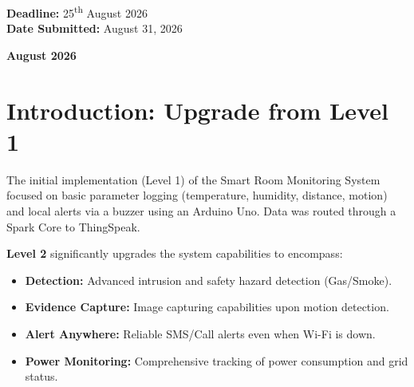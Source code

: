 \documentclass[12pt,a4paper]{article}
\begin{document}
\begin{titlepage}
    \vspace{-1.5cm}
    \begin{flushright}
        \textbf{Deadline:} 25\textsuperscript{th} August 2026 \\
        \textbf{Date Submitted:} August 31, 2026
    \end{flushright}
    
    \vspace{1cm}
    {\large \textbf{August 2026}}
\end{titlepage}

\newpage
\begin{abstract}
This report details the Level 2 upgrade of the Smart Room Monitoring System. Evolving from a basic local monitor, the system now incorporates advanced security, safety, and energy monitoring layers. Utilizing an ESP32-CAM as the core processor, it captures image evidence of intrusions and utilizes a SIM800L GSM module for redundant alerting during Wi-Fi outages. Furthermore, power sensors (ZMPT101B and ACS712) continuously log electrical consumption and grid stability. Data is visualized dynamically on ThingSpeak, with critical alerts dispatched via Telegram and SMS, rendering the system highly autonomous and suitable for real-world deployment in areas with unstable power or internet grids.
\end{abstract}

\tableofcontents
\newpage

\section{Introduction: Upgrade from Level 1}
The initial implementation (Level 1) of the Smart Room Monitoring System focused on basic parameter logging (temperature, humidity, distance, motion) and local alerts via a buzzer using an Arduino Uno. Data was routed through a Spark Core to ThingSpeak. 

\textbf{Level 2} significantly upgrades the system capabilities to encompass:
\begin{itemize}
    \item \textbf{Detection:} Advanced intrusion and safety hazard detection (Gas/Smoke).
    \item \textbf{Evidence Capture:} Image capturing capabilities upon motion detection.
    \item \textbf{Alert Anywhere:} Reliable SMS/Call alerts even when Wi-Fi is down.
    \item \textbf{Power Monitoring:} Comprehensive tracking of power consumption and grid status.
\end{itemize}
\end{document}
